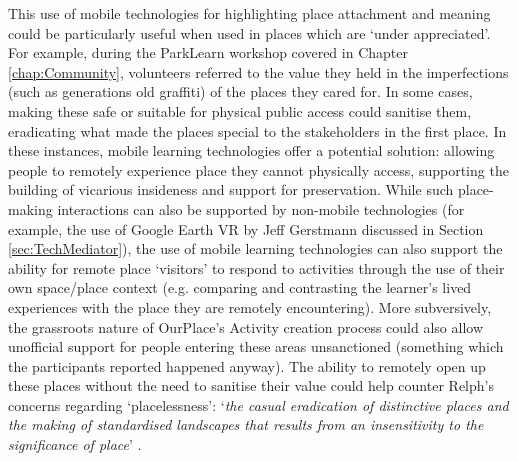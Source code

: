 This use of mobile technologies for highlighting place attachment and meaning could be particularly useful when used in places which are `under appreciated'. For example, during the ParkLearn workshop covered in Chapter \ref{chap:Community}, volunteers referred to the value they held in the imperfections (such as generations old graffiti) of the places they cared for. In some cases, making these safe or suitable for physical public access could sanitise them, eradicating what made the places special to the stakeholders in the first place. In these instances, mobile learning technologies offer a potential solution: allowing people to remotely experience place they cannot physically access, supporting the building of vicarious insideness and support for preservation. While such place-making interactions can also be supported by non-mobile technologies (for example, the use of Google Earth VR by Jeff Gerstmann discussed in Section \ref{sec:TechMediator}), the use of mobile learning technologies can also support the ability for remote place `visitors' to respond to activities through the use of their own space/place context (e.g. comparing and contrasting the learner's lived experiences with the place they are remotely encountering). More subversively, the grassroots nature of OurPlace's Activity creation process could also allow unofficial support for people entering these areas unsanctioned (something which the participants reported happened anyway). The ability to remotely open up these places without the need to sanitise their value could help counter Relph's concerns regarding `placelessness': `\textit{the casual eradication of distinctive places and the making of standardised landscapes that results from an insensitivity to the significance of place}' \citep{Relph1976}.

